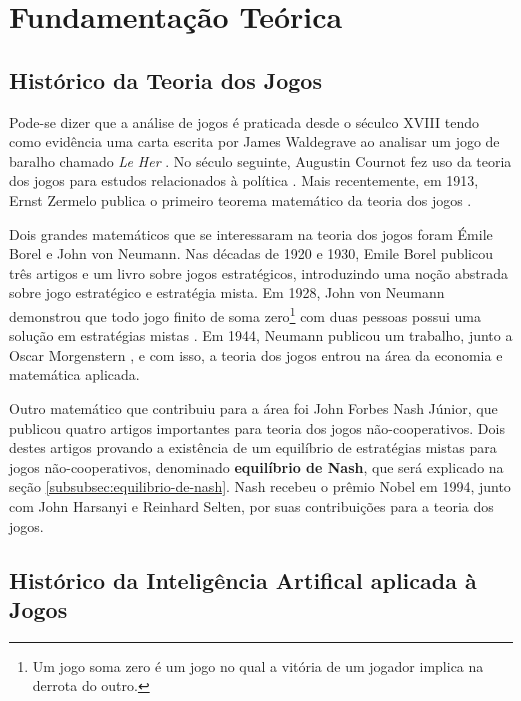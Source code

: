 \chapter[Fundamentação Teórica]{Fundamentação Teórica}
\label{cha:fundamentacao-teorica}

\section{Histórico da Teoria dos Jogos}
\label{sec:historico-da-teoria-dos-jogos}

Pode-se dizer que a análise de jogos é praticada desde o séculco XVIII tendo
como evidência uma carta escrita por James Waldegrave ao analisar um jogo de
baralho chamado \emph{Le Her} \cite{Prague_severalmilestones}. No século
seguinte, Augustin Cournot fez uso da teoria dos jogos para estudos relacionados
à política \cite{cournot_1838}. Mais recentemente, em 1913, Ernst Zermelo
publica o primeiro teorema matemático da teoria dos jogos \cite{zermelo_1913}.

Dois grandes matemáticos que se interessaram na teoria dos jogos foram Émile
Borel e John von Neumann. Nas décadas de 1920 e 1930, Emile Borel publicou três
artigos \cite{borel_1921} \cite{borel_1924} \cite{borel_1927} e um livro
\cite{borel_1938} sobre jogos estratégicos, introduzindo uma noção abstrada
sobre jogo estratégico e estratégia mista. Em 1928, John von Neumann demonstrou
que todo jogo finito de soma zero\footnote{Um jogo soma zero é um jogo no qual a
vitória de um jogador implica na derrota do outro.} com duas pessoas possui uma
solução em estratégias mistas \cite{neumann_1928}. Em 1944, Neumann publicou um
trabalho, junto a Oscar Morgenstern \cite{neumann_1944}, e com isso, a teoria
dos jogos entrou na área da economia e matemática aplicada.

Outro matemático que contribuiu para a área foi John Forbes Nash Júnior, que
publicou quatro artigos importantes para teoria dos jogos não-cooperativos. Dois
destes artigos \cite{nash_1950} \cite{nash_1951} provando a existência de um
equilíbrio de estratégias mistas para jogos não-cooperativos, denominado
\textbf{equilíbrio de Nash}, que será explicado na seção
\ref{subsubsec:equilibrio-de-nash}. Nash recebeu o prêmio Nobel em 1994, junto
com John Harsanyi e Reinhard Selten, por suas contribuições para a teoria dos
jogos.

\section{Histórico da Inteligência Artifical aplicada à Jogos}

